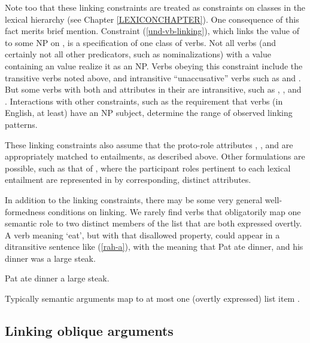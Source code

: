 \documentclass[output=paper]{langsci/langscibook}
\begin{document}
Note too that these linking constraints are treated as constraints on classes in the lexical hierarchy (see Chapter \ref{LEXICONCHAPTER}).
One consequence of this fact merits brief mention.
Constraint (\ref{und-vb-linking}), which links the value of  to some NP on \argst, is a specification of one class of verbs.
Not all verbs (and certainly not all other predicators, such as nominalizations) with a \content value containing an  value realize it as an NP.
Verbs obeying this constraint include the transitive verbs noted above, and intransitive ``unaccusative'' verbs such as  and .
But some verbs with both  and  attributes in their \content are intransitive, such as , , and .
Interactions with other constraints, such as the requirement that verbs (in English, at least) have an NP subject, determine the range of observed linking patterns.

These linking constraints also assume that the proto-role attributes , , and  are appropriately matched to entailments, as described above.
Other formulations are possible, such as that of \citet{KoenigandDavis2003}, where the participant roles pertinent to each lexical entailment are represented in \content by corresponding, distinct attributes.

In addition to the linking constraints, there may be some very general well-formedness conditions on linking.  We rarely find verbs that obligatorily map one semantic role to two distinct members of the \argst list that are both expressed overtly.  A verb meaning `eat', but with that disallowed property, could appear in a ditransitive sentence like (\ref{rah-a}), with the meaning that Pat ate dinner, and his dinner was a large steak.  

\begin{exe}
\label{rah-a} 
	\ex *Pat ate dinner a large steak.
\end{exe}

\noindent
Typically semantic arguments map to at most one (overtly expressed) \argst list item \citep[262-268]{Davis2001}.  

\subsection{Linking oblique arguments}
\end{document}
